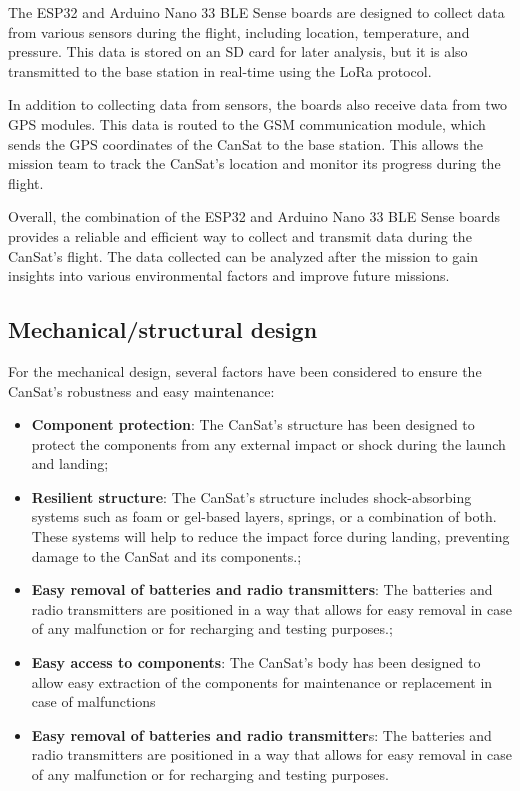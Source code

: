 \documentclass[11pt]{article}
\begin{document}
The ESP32 and Arduino Nano 33 BLE Sense boards are designed to collect data from various sensors during the flight, including location, temperature, and pressure. This data is stored on an SD card for later analysis, but it is also transmitted to the base station in real-time using the LoRa protocol.

In addition to collecting data from sensors, the boards also receive data from two GPS modules. This data is routed to the GSM communication module, which sends the GPS coordinates of the CanSat to the base station. This allows the mission team to track the CanSat's location and monitor its progress during the flight.

Overall, the combination of the ESP32 and Arduino Nano 33 BLE Sense boards provides a reliable and efficient way to collect and transmit data during the CanSat's flight. The data collected can be analyzed after the mission to gain insights into various environmental factors and improve future missions.


\subsection{Mechanical/structural design}

For the mechanical design, several factors have been considered to ensure the CanSat's robustness and easy maintenance:
\begin{itemize}[leftmargin=1.75cm,itemindent=0cm, noitemsep, topsep=3pt,  label=\faCheck]
    \item \textbf{Component protection}: The CanSat's structure has been designed to protect the components from any external impact or shock during the launch and landing;
    \item \textbf{Resilient structure}: The CanSat's structure includes shock-absorbing systems such as foam or gel-based layers, springs, or a combination of both. These systems will help to reduce the impact force during landing, preventing damage to the CanSat and its components.;
    \item \textbf{Easy removal of batteries and radio transmitters}: The batteries and radio transmitters are positioned in a way that allows for easy removal in case of any malfunction or for recharging and testing purposes.;
    \item \textbf{Easy access to components}: The CanSat's body has been designed to allow easy extraction of the components for maintenance or replacement in case of malfunctions
    \item \textbf{Easy removal of batteries and radio transmitter}s: The batteries and radio transmitters are positioned in a way that allows for easy removal in case of any malfunction or for recharging and testing purposes.
\end{itemize}
\end{document}
